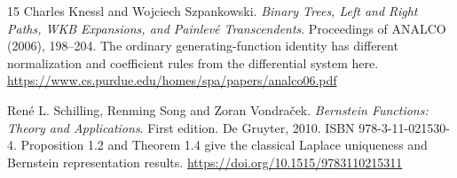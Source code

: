 \begin{thebibliography}{15}
 Charles Knessl and Wojciech Szpankowski.
\emph{Binary Trees, Left and Right Paths, WKB Expansions, and Painlevé Transcendents}.
Proceedings of ANALCO (2006), 198--204.
The ordinary generating-function identity has different normalization and
coefficient rules from the differential system here.
\url{https://www.cs.purdue.edu/homes/spa/papers/analco06.pdf}

 René L. Schilling, Renming Song and Zoran Vondraček.
\emph{Bernstein Functions: Theory and Applications}.
First edition. De Gruyter, 2010. ISBN 978-3-11-021530-4.
Proposition 1.2 and Theorem 1.4 give the classical Laplace uniqueness and
Bernstein representation results.
\url{https://doi.org/10.1515/9783110215311}
\end{thebibliography}
\endgroup
